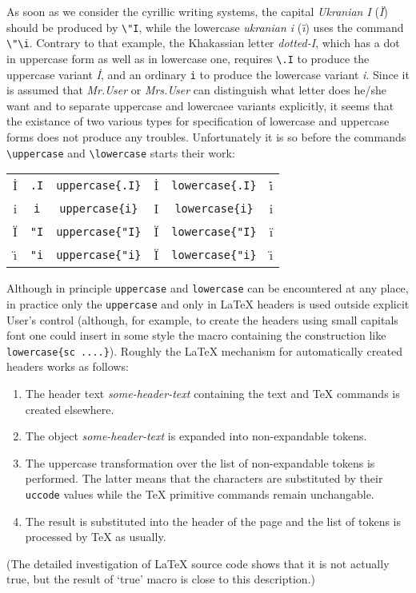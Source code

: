 As soon as we consider the cyrillic writing systems, the capital
{\sl Ukranian I} ({\sl \"I}) should be produced by \verb?\"I?,
while the lowercase {\sl ukranian i} ({\sl \"\i}) uses the command
\verb?\"\i?. Contrary to that example, the Khakassian letter
{\sl dotted-I}, which has a dot in uppercase form as well as
in lowercase one, requires \verb?\.I? to produce the uppercase variant
{\sl \.I}, and an ordinary \verb?i? to produce the lowercase
variant {\sl i}.
Since it is assumed that {\it Mr.\space User} or {\it Mrs.\space User}
can distinguish what letter does he/she want and to separate uppercase
and lowercaee variants explicitly, it seems that the existance
of two various types for specification of lowercase and uppercase
forms does not produce any troubles. Unfortunately it is so before
the commands \verb?\uppercase? and \verb?\lowercase? starts their work:
\begin{center}
\begin{tabular}{c@{ = }cc@{ = }cc@{ = }c}
 \.I & {\tt\bs{}.I}
&
{\tt\bs{}uppercase\{\bs{}.I\}} & \uppercase{\.I}
&
{\tt\bs{}lowercase\{\bs{}.I\}} & \lowercase{\.I}
\\
 i & {\tt i}
&
{\tt\bs{}uppercase\{i\}} & \uppercase{i}
&
{\tt\bs{}lowercase\{i\}} & \lowercase{i}
\\
 \"I & {\tt\bs{}"I}
&
{\tt\bs{}uppercase\{\bs{}"I\}} & \uppercase{\"I}
&
{\tt\bs{}lowercase\{\bs{}"I\}} & \lowercase{\"I}
\\
\"\i & {\tt\bs{}"\bs{}i}
&
{\tt\bs{}uppercase\{\bs{}"\bs{}i\}} & \uppercase{\"\i}
&
{\tt\bs{}lowercase\{\bs{}"\bs{}i\}} & \lowercase{\"\i}
\end{tabular}
\end{center}

Although in principle {\tt\bs{}uppercase} and {\tt\bs{}lowercase}
can be encountered at any place, in practice only the {\tt\bs{}uppercase}
and only in \LaTeX{} headers is used outside explicit User's control
(although, for example, to create the headers using {\sc small capitals}
font one could insert in some style the macro containing
the construction like {\tt\bs{}lowercase\{\bs{}sc ....\}}).
Roughly the \LaTeX{} mechanism for automatically
created headers works as follows:
\begin{enumerate}
\item The header text {\em some-header-text} containing the text
      and \TeX{} commands is created elsewhere.
\item The object {\em some-header-text} is expanded into non-expandable
      tokens.
\item The uppercase transformation over the list of
      non-expandable tokens is performed.
      The latter means that the characters
      are substituted by their {\tt\bs{}uccode} values while the \TeX{}
      primitive commands remain unchangable.
\item The result is substituted into the header of the page and
      the list of tokens is processed by \TeX{} as usually.
\end{enumerate}
(The detailed investigation of \LaTeX{} source code shows that it
is not actually true, but the result of `true' macro is close
to this description.)

